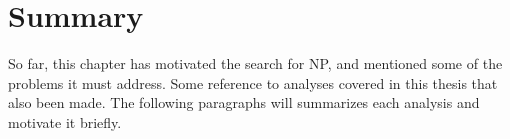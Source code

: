 \section{Summary}

So far, this chapter has motivated the search for NP, and mentioned some of the problems it must
address.
Some reference to analyses covered in this thesis that also been made.
The following paragraphs will summarizes each analysis and motivate it briefly.












